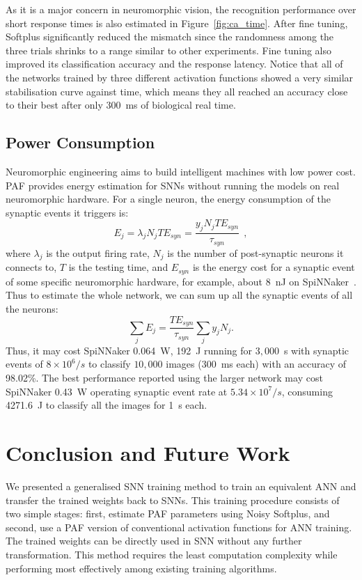 \documentclass{article}
\begin{document}
As it is a major concern in neuromorphic vision, the recognition performance over short response times is also estimated in Figure~\ref{fig:ca_time}.
After fine tuning, Softplus significantly reduced the mismatch since the randomness among the three trials shrinks to a range similar to other experiments.
Fine tuning also improved its classification accuracy and the response latency.
Notice that all of the networks trained by three different activation functions showed a very similar stabilisation curve against time, which means they all reached an accuracy close to their best after only 300~ms of biological real time. 


\subsection{Power Consumption}
Neuromorphic engineering aims to build intelligent machines with low power cost.
PAF provides energy estimation for SNNs without running the models on real neuromorphic hardware.
For a single neuron, the energy consumption of the synaptic events it triggers is:
\begin{equation}
E_{j} = \lambda_j N_j T E_{syn} = \dfrac{y_j N_j T E_{syn}}{\tau_{syn}}~~,
\label{equ:energy}
\end{equation}
where $\lambda_j$ is the output firing rate, $N_j$ is the number of post-synaptic neurons it connects to, $T$ is the testing time, and $E_{syn}$ is the energy cost for a synaptic event of some specific neuromorphic hardware, for example, about 8~nJ on SpiNNaker~\cite{stromatias2013power}.
Thus to estimate the whole network, we can sum up all the synaptic events of all the neurons:
\begin{equation}
\sum_j E_{j} =  \dfrac{T E_{syn}}{\tau_{syn}} \sum_{j}y_j N_j.
\end{equation}
Thus, it may cost SpiNNaker 0.064~W, 192~J running for $3,000$~s with synaptic events of $8\times10^6/s$ to classify $10,000$ images (300~ms each) with an accuracy of 98.02\%.
The best performance reported using the larger network may cost SpiNNaker 0.43~W operating synaptic event rate at $5.34\times10^7/s$, consuming 4271.6~J to classify all the images for 1~s each.

\section{Conclusion and Future Work}
We presented a generalised SNN training method to train an equivalent ANN and transfer the trained weights back to SNNs.
This training procedure consists of two simple stages: first, estimate PAF parameters using Noisy Softplus, and second, use a PAF version of conventional activation functions for ANN training. %
The trained weights can be directly used in SNN without any further transformation.
This method requires the least computation complexity while performing most effectively among existing training algorithms.
\end{document}

